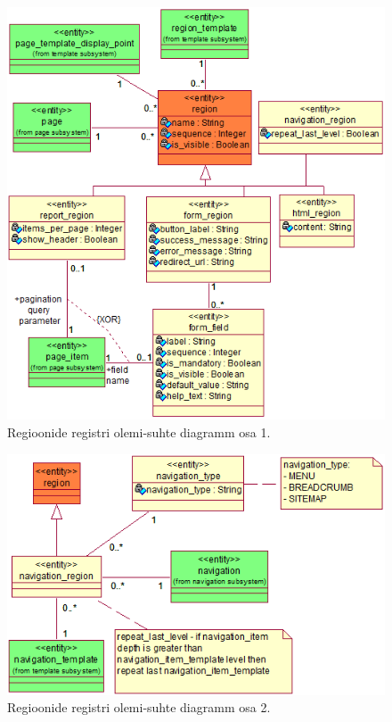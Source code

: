 \documentclass[a4paper,12pt]{article} %
\begin{document}
\begin{figure}[H]
\centering
\includegraphics[width=\textwidth]{./diagrams/region-er-diagram.png}
\caption{Regioonide registri olemi-suhte diagramm osa 1.}
\label{fig_regioonide_registri_olemi_suhte_diagramm}
\end{figure}

\begin{figure}[H]
\centering
\includegraphics[width=\textwidth]{./diagrams/navigation-region-er-diagram.png}
\caption{Regioonide registri olemi-suhte diagramm osa 2.}
\label{fig_navigatsiooni_regioonide_registri_olemi_suhte_diagramm}
\end{figure}
\end{document}
